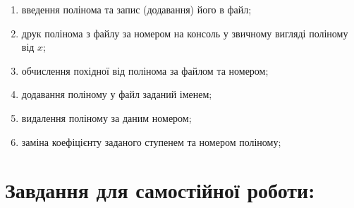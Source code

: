 \documentclass[a5paper,titlepage,openany,twoside,draft]{book_unv}%
\makeatletter
\newcommand{\xslalph}[1]{\expandafter\@xslalph\csname c@#1\endcsname}
\newcommand{\@xslalph}[1]{%
    \ifcase#1\or а\or б\or в\or г\or д\or e\or є\or ж\or з\or i%
    \or й\or к\or л\or м\or н\or о\or п\or р\or с\or т%
    \or у\or ф\or х\or ц\or ч\or ш\or ю\or я\or аа\or бб\or вв%
    \else\@ctrerr\fi%
}
\makeatother
\begin{document}
\begin{enumerate}
\begin{enumerate}[label=\xslalph*)]
\item
введення полінома та запис (додавання) його в файл; 
\item
друк полінома з файлу за номером на консоль у звичному вигляді поліному від $x$;
\item
обчислення похідної від полінома за файлом та номером;
\item
додавання поліному у файл заданий іменем;
\item
видалення поліному за даним номером;
\item
заміна коефіцієнту заданого ступенем та номером поліному;

\end{enumerate}

\end{enumerate}


\section{Завдання для самостійної роботи:}
\end{document}
